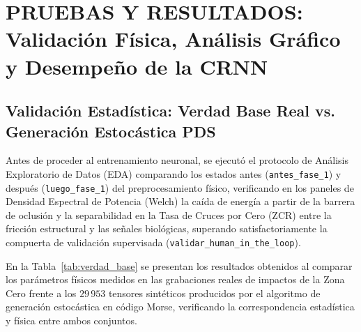 \documentclass[11pt, a4paper]{article}
\begin{document}
\section{PRUEBAS Y RESULTADOS: Validación Física, Análisis Gráfico y Desempeño de la CRNN}

\subsection{Validación Estadística: Verdad Base Real vs. Generación Estocástica PDS}
Antes de proceder al entrenamiento neuronal, se ejecutó el protocolo de Análisis Exploratorio de Datos (EDA) comparando los estados antes (\texttt{antes\_fase\_1}) y después (\texttt{luego\_fase\_1}) del preprocesamiento físico, verificando en los paneles de Densidad Espectral de Potencia (Welch) la caída de energía a partir de la barrera de oclusión y la separabilidad en la Tasa de Cruces por Cero (ZCR) entre la fricción estructural y las señales biológicas, superando satisfactoriamente la compuerta de validación supervisada (\texttt{validar\_human\_in\_the\_loop}).

En la Tabla~\ref{tab:verdad_base} se presentan los resultados obtenidos al comparar los parámetros físicos medidos en las grabaciones reales de impactos de la Zona Cero frente a los $29\,953$ tensores sintéticos producidos por el algoritmo de generación estocástica en código Morse, verificando la correspondencia estadística y física entre ambos conjuntos.
\end{document}
